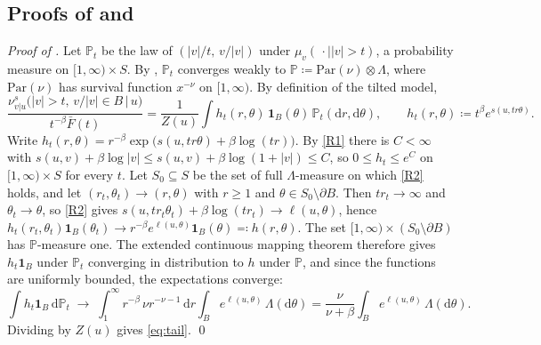 \documentclass[11pt]{article}
\theoremstyle{plain}
\theoremstyle{definition}
\theoremstyle{remark}
\newcommand{\Dd}{\mathrm{d}}
\newcommand{\define}{\coloneqq}
\newcommand{\abs}[1]{\left\lvert #1 \right\rvert}
\newcommand{\indicator}{\mathbf{1}}
\begin{document}
\subsection{Proofs of \texorpdfstring{}{Theorem 4.12} and \texorpdfstring{}{Corollary 4.13}}
\label{app:tail}
\emph{Proof of .}
Let $\mathbb{P}_t$ be the law of $(\abs{v}/t,\,v/\abs{v})$ under
$\mu_v(\,\cdot\mid\abs{v}>t)$, a probability measure on $[1,\infty)\times S$.
By , $\mathbb{P}_t$ converges weakly to
$\mathbb{P}\define\mathrm{Par}(\nu)\otimes\Lambda$, where $\mathrm{Par}(\nu)$
has survival function $x^{-\nu}$ on $[1,\infty)$. By definition of the tilted
model,
\begin{equation*}
 \frac{\nu^{s}_{v\vert u}\bigl(\abs{v}>t,\,v/\abs{v}\in B\,\big\vert\,u\bigr)}{t^{-\beta}\bar F(t)}
 =\frac{1}{Z(u)}\int h_t(r,\theta)\,\indicator_B(\theta)\,\mathbb{P}_t(\Dd r,\Dd\theta),
 \qquad h_t(r,\theta)\define t^{\beta}e^{s(u,tr\theta)}.
\end{equation*}
Write $h_t(r,\theta)=r^{-\beta}\exp\bigl(s(u,tr\theta)+\beta\log(tr)\bigr)$.
By \ref{R1} there is $C<\infty$ with
$s(u,v)+\beta\log\abs{v}\le s(u,v)+\beta\log(1+\abs{v})\le C$, so
$0\le h_t\le e^{C}$ on $[1,\infty)\times S$ for every $t$. Let $S_0\subseteq S$
be the set of full $\Lambda$-measure on which \ref{R2} holds, and let
$(r_t,\theta_t)\to(r,\theta)$ with $r\ge1$ and $\theta\in S_0\setminus\partial B$.
Then $tr_t\to\infty$ and $\theta_t\to\theta$, so \ref{R2} gives
$s(u,tr_t\theta_t)+\beta\log(tr_t)\to\ell(u,\theta)$, hence
$h_t(r_t,\theta_t)\indicator_B(\theta_t)\to r^{-\beta}e^{\ell(u,\theta)}\indicator_B(\theta)\eqqcolon h(r,\theta)$.
The set $[1,\infty)\times(S_0\setminus\partial B)$ has $\mathbb{P}$-measure
one. The extended continuous mapping theorem \cite[Thm.~5.5]{billingsley1968convergence}
therefore gives $h_t\indicator_B$ under $\mathbb{P}_t$ converging in
distribution to $h$ under $\mathbb{P}$, and since the functions are uniformly
bounded, the expectations converge:
\begin{equation*}
 \int h_t\indicator_B\,\Dd\mathbb{P}_t\;\longrightarrow\;
 \int_{1}^{\infty}r^{-\beta}\,\nu r^{-\nu-1}\,\Dd r\int_{B}e^{\ell(u,\theta)}\,\Lambda(\Dd\theta)
 =\frac{\nu}{\nu+\beta}\int_{B}e^{\ell(u,\theta)}\,\Lambda(\Dd\theta).
\end{equation*}
Dividing by $Z(u)$ gives \eqref{eq:tail}.
\qed
\end{document}
